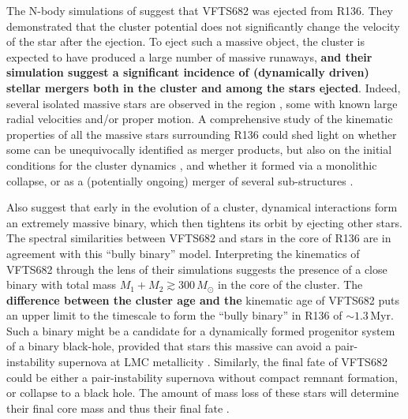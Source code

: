 \documentclass[a4paper,fleqn,usenatbib]{mnras}
\newcommand{\newtext}[1]{{\color{ForestGreen}\bf{#1}}}
\begin{document}
The N-body simulations of \citet{banerjee:12} suggest that VFTS682 was ejected from R136. They
demonstrated that the cluster potential does not significantly change
the velocity of the star after the ejection.
To eject such a massive object, the cluster is
expected to have produced a large number of massive runaways,
\newtext{and their simulation suggest a significant incidence of
 (dynamically driven) stellar mergers both in the cluster and among
 the stars ejected}. Indeed, several %
isolated massive stars are observed in the region \citep[][]{evans:10,lennon:18}, some with known
large radial velocities and/or proper motion. 
A comprehensive study of the kinematic
properties of all the massive stars surrounding R136 could shed light
on whether some can be unequivocally identified as merger products,
but also on the initial conditions for the cluster dynamics
\citep[e.g.,][]{oh:16}, and whether it formed via a monolithic collapse, or
as a (potentially ongoing) merger of several sub-structures \citep[e.g.,][]{sabbi:12}.

Also \cite{fujii:11} suggest that
early in the evolution of a cluster, dynamical interactions form an extremely
massive binary, which then tightens its orbit by ejecting other
stars. The spectral similarities between VFTS682 and stars in the core
of R136 are in agreement with this ``bully binary'' model. Interpreting the kinematics of VFTS682 through the lens of their simulations
suggests the presence of a close binary with total mass
$M_1+M_2\gtrsim 300\,M_\odot$ in the core of the cluster. The
\newtext{difference between the cluster age and the} kinematic age of VFTS682 puts an
upper limit to the timescale to form the ``bully binary'' in
R136 of \newtext{$\sim$$1.3\,\mathrm{Myr}$}. %
Such a binary %
might be a %
candidate for a dynamically formed progenitor system of
a binary black-hole, provided that stars this massive can avoid a
pair-instability supernova \cite[e.g.,][]{rakavy:67} at LMC
metallicity \citep[see also][]{langer:07, woosley:17}.
Similarly, the final fate of VFTS682 could be either a
pair-instability supernova without compact remnant formation, or collapse to a black hole. The amount of mass loss of these stars will determine their final core
mass and thus their final fate \newtext{\cite[e.g.,][]{vink:15}}.
\end{document}
